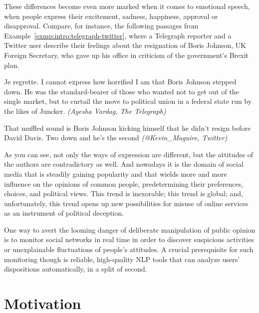 These differences become even more marked when it comes to emotional
speech, when people express their excitement, sadness, happiness,
approval or disapproval.  Compare, for instance, the following
passages from Example~\ref{exmp:intro:telegraph-twitter}, where a
Telegraph reporter and a Twitter user describe their feelings about
the resignation of Boris Johnson, UK Foreign Secretary, who gave up
his office in criticism of the government's Brexit plan.
\begin{example}\label{exmp:intro:telegraph-twitter}
Je regrette. I cannot express how horrified I am that Boris Johnson
stepped down. He was the standard-bearer of those who wanted not to
get out of the single market, but to curtail the move to political
union in a federal state run by the likes of Juncker. \emph{(Ayesha
  Vardag, The Telegraph)}

\noindent{}That muffled sound is Boris Johnson kicking himself that he
didn't resign before David Davis. Two down and he's the second
\emph{(@Kevin\_Maguire, Twitter)}
\end{example}
As you can see, not only the ways of expression are different, but the
attitudes of the authors are contradictory as well. And nowadays it is
the domain of social media that is steadily gaining popularity and
that wields more and more influence on the opinions of common people,
predetermining their preferences, choices, and political views.  This
trend is inexorable; this trend is global; and, unfortunately, this
trend opens up new possibilities for misuse of online services as an
instrument of political deception.

One way to avert the looming danger of deliberate manipulation of
public opinion is to monitor social networks in real time in order to
discover suspicious activities or unexplainable fluctuations of
people's attitudes.  A crucial prerequisite for such monitoring though
is reliable, high-quality NLP tools that can analyze users'
dispositions automatically, in a split of second.

\section*{Motivation}

